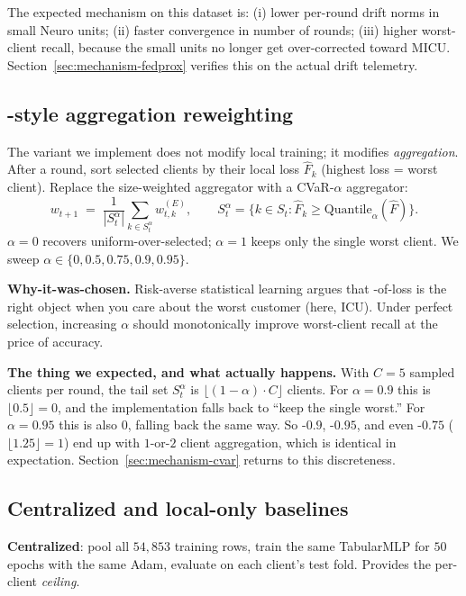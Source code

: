The expected mechanism on this dataset is: (i) lower per-round drift norms in
small Neuro units; (ii) faster convergence in number of rounds; (iii) higher
worst-client recall, because the small units no longer get over-corrected
toward MICU. Section~\ref{sec:mechanism-fedprox} verifies this on the actual
drift telemetry.

\subsection{\cvar{}-style aggregation reweighting}
The \cvar{} variant we implement does not modify local training; it modifies
\emph{aggregation}. After a round, sort selected clients by their local loss
$\hat{F}_{k}$ (highest loss = worst client). Replace the size-weighted
aggregator with a CVaR-$\alpha$ aggregator:
\[
w_{t+1} \;=\; \frac{1}{|S_t^{\alpha}|} \sum_{k \in S_t^{\alpha}} w_{t,k}^{(E)},
\qquad S_t^{\alpha} = \{k \in S_t : \hat{F}_k \geq \mathrm{Quantile}_\alpha(\hat{F})\}.
\]
$\alpha \!=\! 0$ recovers uniform-over-selected; $\alpha \!=\! 1$ keeps only the
single worst client. We sweep $\alpha \in \{0, 0.5, 0.75, 0.9, 0.95\}$.

\textbf{Why-it-was-chosen.} Risk-averse statistical learning argues that
\cvar{}-of-loss is the right object when you care about the worst customer
(here, ICU). Under perfect selection, increasing $\alpha$ should monotonically
improve worst-client recall at the price of accuracy.

\textbf{The thing we expected, and what actually happens.} With $C\!=\!5$
sampled clients per round, the tail set $S_t^{\alpha}$ is
$\lfloor (1-\alpha)\!\cdot\!C \rfloor$ clients. For $\alpha \!=\! 0.9$ this is
$\lfloor 0.5 \rfloor \!=\! 0$, and the implementation falls back to ``keep the
single worst.'' For $\alpha \!=\! 0.95$ this is also $0$, falling back the same
way. So \cvar{}-$0.9$, \cvar{}-$0.95$, and even \cvar{}-$0.75$ ($\lfloor 1.25
\rfloor = 1$) end up with $1$-or-$2$ client aggregation, which is identical in
expectation. Section~\ref{sec:mechanism-cvar} returns to this discreteness.

\subsection{Centralized and local-only baselines}
\textbf{Centralized}: pool all $54{,}853$ training rows, train the same
TabularMLP for $50$ epochs with the same Adam, evaluate on each client's test
fold. Provides the per-client \emph{ceiling}.

